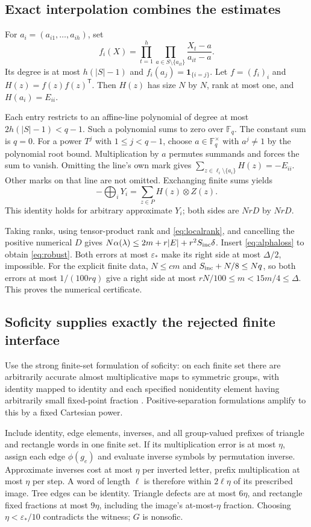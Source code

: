 \documentclass[11pt]{article}
\theoremstyle{definition}
\newcommand{\F}{\mathbb F}
\newcommand{\eps}{\varepsilon}
\begin{document}
\subsection{Exact interpolation combines the estimates}
For $a_i=(a_{i1},\ldots,a_{ih})$, set
\[
 f_i(X)=\prod_{t=1}^h\prod_{a\in S\setminus\{a_{it}\}}
 \frac{X_t-a}{a_{it}-a}.
\]
Its degree is at most $h(|S|-1)$ and $f_i(a_j)=\mathbf1_{\{i=j\}}$.
Let $f=(f_i)_i$ and $H(z)=f(z)f(z)^{\mathsf T}$.
Then $H(z)$ has size $N$ by $N$, rank at most one, and
$H(a_i)=E_{ii}$.

Each entry restricts to an affine-line polynomial of degree at most
$2h(|S|-1)<q-1$. Such a polynomial sums to zero over $\F_q$.
The constant sum is $q=0$. For a power $T^j$ with $1\le j<q-1$,
choose $a\in\F_q^\times$ with $a^j\ne1$ by the polynomial root
bound. Multiplication by $a$ permutes summands and forces the sum
to vanish. Omitting the line's own mark gives
$\sum_{z\in\ell_i\setminus\{a_i\}}H(z)=-E_{ii}$.
Other marks on that line are not omitted.
Exchanging finite sums yields
\begin{equation}\label{eq:tensoridentity}
 -\bigoplus_iY_i=\sum_{z\in P}H(z)\otimes Z(z).
\end{equation}
This identity holds for arbitrary approximate $Y_i$; both sides
are $NrD$ by $NrD$.

Taking ranks, using tensor-product rank and \eqref{eq:localrank},
and cancelling the positive numerical $D$ gives
$N\alpha(\lambda)\le2m+r|E|+r^2S_{\rm inc}\delta$.
Insert \eqref{eq:alphaloss} to obtain \eqref{eq:robust}.
Both errors at most $\eps_*$ make its right side at most
$\Delta/2$, impossible. For the explicit finite data, $N\le cm$
and $S_{\rm inc}+N/8\le Nq$, so both errors at most $1/(100rq)$
give a right side at most $rN/100\le m<15m/4\le\Delta$.
This proves the numerical certificate.

\subsection{Soficity supplies exactly the rejected finite interface}
Use the strong finite-set formulation of soficity: on each finite set
there are arbitrarily accurate almost multiplicative maps to symmetric
groups, with identity mapped to identity and each specified nonidentity
element having arbitrarily small fixed-point fraction \cite{pestov}.
Positive-separation formulations amplify to this by a fixed Cartesian
power.

Include identity, edge elements, inverses, and all group-valued prefixes
of triangle and rectangle words in one finite set. If its multiplication
error is at most $\eta$, assign each edge $\phi(g_e)$ and evaluate
inverse symbols by permutation inverse. Approximate inverses cost at
most $\eta$ per inverted letter, prefix multiplication at most $\eta$
per step. A word of length $\ell$ is therefore within $2\ell\eta$
of its prescribed image. Tree edges can be identity. Triangle defects
are at most $6\eta$, and rectangle fixed fractions at most $9\eta$,
including the image's at-most-$\eta$ fraction.
Choosing $\eta<\eps_*/10$ contradicts the witness; $G$ is nonsofic.
\end{document}
